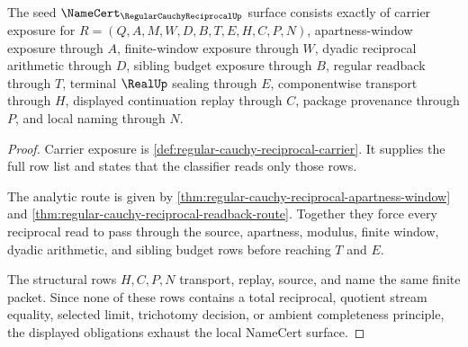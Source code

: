 \begin{theorem}
\label{thm:regular-cauchy-reciprocal-namecert-obligations}
The seed $\NameCert_{\RegularCauchyReciprocalUp}$ surface consists exactly of carrier exposure for $R=(Q,A,M,W,D,B,T,E,H,C,P,N)$, apartness-window exposure through $A$, finite-window exposure through $W$, dyadic reciprocal arithmetic through $D$, sibling budget exposure through $B$, regular readback through $T$, terminal $\RealUp$ sealing through $E$, componentwise transport through $H$, displayed continuation replay through $C$, package provenance through $P$, and local naming through $N$.
\end{theorem}
\begin{proof}
Carrier exposure is \autoref{def:regular-cauchy-reciprocal-carrier}. It supplies the full row list and states that the classifier reads only those rows.

The analytic route is given by \autoref{thm:regular-cauchy-reciprocal-apartness-window} and \autoref{thm:regular-cauchy-reciprocal-readback-route}. Together they force every reciprocal read to pass through the source, apartness, modulus, finite window, dyadic arithmetic, and sibling budget rows before reaching $T$ and $E$.

The structural rows $H,C,P,N$ transport, replay, source, and name the same finite packet. Since none of these rows contains a total reciprocal, quotient stream equality, selected limit, trichotomy decision, or ambient completeness principle, the displayed obligations exhaust the local NameCert surface.
\end{proof}

